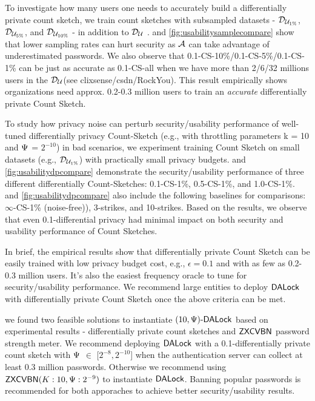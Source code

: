 To investigate how many users one needs to accurately build a differentially private count sketch, we train count sketches with subsampled datasets - $\mathcal{D}_{{\mathcal{U}_{1\%}}}$, $\mathcal{D}_{{\mathcal{U}_{5\%}}}$, and $\mathcal{D}_{{\mathcal{U}_{10\%}}}$ - in addition to $\mathcal{D}_{{\mathcal{U}}}$ .  and \ref{fig:usabilitysamplecompare} show that lower sampling rates can hurt security as $\mathcal{A}$ can take advantage of underestimated passwords. We also observe that  0.1-CS-10\%/0.1-CS-5\%/0.1-CS-1\% can be just as accurate as 0.1-CS-all when we have more than 2/6/32 millions users in the $\mathcal{D}_{{\mathcal{U}}}$(see clixsense/csdn/RockYou). This result empirically shows organizations need approx. 0.2-0.3 million users to train an \textit{accurate} differentially private Count Sketch. 

To study how privacy noise can perturb security/usability performance of well-tuned differentially privacy Count-Sketch (e.g., with throttling parameters k = 10 and $\Psi$ = $2^{-10}$) in bad scenarios, we experiment training Count Sketch on small datasets (e.g., $\mathcal{D}_{{\mathcal{U}_{1\%}}}$) with practically small privacy budgets.  and \ref{fig:usabilitydpcompare} demonstrate the security/usability performance of three different differentially Count-Sketches: 0.1-CS-1\%, 0.5-CS-1\%, and 1.0-CS-1\%.   and \ref{fig:usabilitydpcompare} also include the following baselines for comparisons: $\infty$-CS-1\% (noise-free)), 3-strikes, and 10-strikes. Based on the results, we observe that even 0.1-differential privacy had minimal impact on both security and usability performance of Count Sketches. 

In brief, the empirical results show that differentially private Count Sketch can be easily trained with low privacy budget cost, e.g., $\epsilon = 0.1$ and with as few as 0.2-0.3 million users. It's also the easiest frequency oracle to tune for security/usability performance. We recommend large entities to deploy $\mathsf{DALock}$ with differentially private Count Sketch once the above criteria can be met.

 we found two feasible solutions to instantiate $(10, \Psi)\text{-}\mathsf{DALock}$ based on experimental results - differentially private count sketches and $\mathsf{ZXCVBN}$ password strength meter. We recommend deploying $\mathsf{DALock}$ with a 0.1-differentially private count sketch with $\Psi$ $\in$ [$2^{-8},2^{-10}$] when the authentication server can collect at least 0.3 million passwords. Otherwise we recommend using $\mathsf{ZXCVBN}(K:10,\Psi:2^{-9})$ to instantiate $\mathsf{DALock}$. Banning popular passwords is recommended for both apporaches to achieve better security/usability results. 



